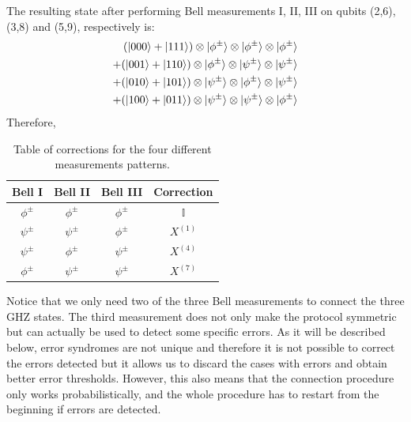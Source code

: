 \documentclass[10pt,a4paper]{book}
\numberwithin{equation}{chapter}
\numberwithin{figure}{chapter}
\numberwithin{table}{chapter}
\begin{document}
The resulting state after performing Bell measurements I, II, III on qubits (2,6), (3,8) and (5,9), respectively is:
\begin{align}
  (\ket{000}+\ket{111})\otimes \ket{\phi^{\pm}}\otimes \ket{\phi^{\pm}}\otimes \ket{\phi^{\pm}} \\
+ (\ket{001}+\ket{110})\otimes \ket{\phi^{\pm}}\otimes \ket{\psi^{\pm}}\otimes \ket{\psi^{\pm}} \\
+ (\ket{010}+\ket{101})\otimes \ket{\psi^{\pm}}\otimes \ket{\phi^{\pm}}\otimes \ket{\psi^{\pm}} \\
+ (\ket{100}+\ket{011})\otimes \ket{\psi^{\pm}}\otimes \ket{\psi^{\pm}}\otimes \ket{\phi^{\pm}} 
\end{align}
Therefore, 
\begin{table}[H]
    \centering
    \begin{tabular}{|c c c|c|}
    \hline
    Bell I & Bell II & Bell III & Correction \\
    \hline
    $\phi^{\pm}$&$\phi^{\pm}$&$\phi^{\pm}$&$\mathbb{I}$\\
    $\psi^{\pm}$&$\psi^{\pm}$&$\phi^{\pm}$&$X^{(1)}$\\
    $\psi^{\pm}$&$\phi^{\pm}$&$\psi^{\pm}$&$X^{(4)}$\\
    $\phi^{\pm}$&$\psi^{\pm}$&$\psi^{\pm}$&$X^{(7)}$\\
    \hline
    \end{tabular}
	\caption{\footnotesize Table of corrections for the four different measurements patterns.}
	\label{tab:NOerror}
\end{table}

Notice that we only need two of the three Bell measurements to connect the three GHZ states. The third measurement does not only make the protocol symmetric but can actually be used to detect some specific errors. As it will be described below, error syndromes are not unique and therefore it is not possible to correct the errors detected but it allows us to discard the cases with errors and obtain better error thresholds. However, this also means that the connection procedure only works probabilistically, and the whole procedure has to restart from the beginning if errors are detected.
\end{document}
